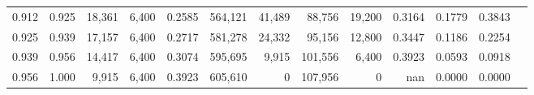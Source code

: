 \begin{tabular}{rrrrrrrrrrrrr}
0.912 & 0.925 & 18,361 & 6,400 &                                     0.2585 & 564,121 &  41,489 &  88,756 &  19,200 & 0.3164 & 0.1779 & 0.3843 \\
0.925 & 0.939 & 17,157 & 6,400 &                                     0.2717 & 581,278 &  24,332 &  95,156 &  12,800 & 0.3447 & 0.1186 & 0.2254 \\
0.939 & 0.956 & 14,417 & 6,400 &                                     0.3074 & 595,695 &   9,915 & 101,556 &   6,400 & 0.3923 & 0.0593 & 0.0918 \\
0.956 & 1.000 &  9,915 & 6,400 &                                     0.3923 & 605,610 &       0 & 107,956 &       0 &    nan & 0.0000 & 0.0000 \\
\bottomrule
\end{tabular}
